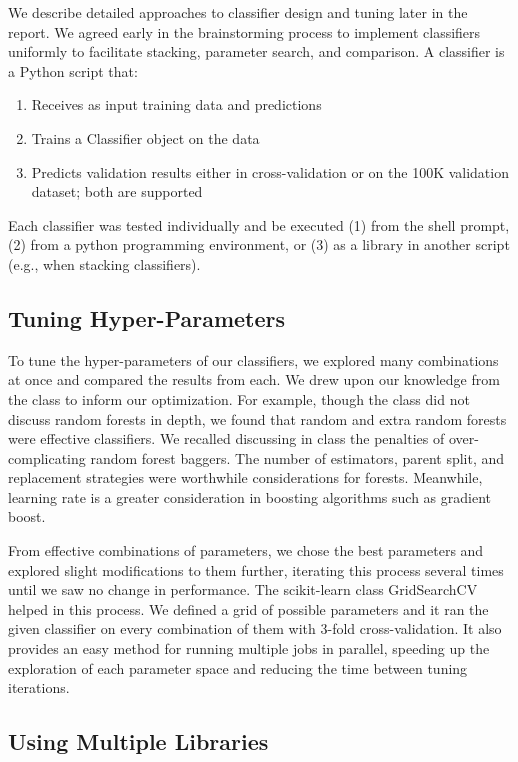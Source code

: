 \documentclass{article}
\begin{document}
We describe detailed approaches to classifier design and tuning later in the report. 
We agreed early in the brainstorming process to implement classifiers uniformly to facilitate stacking, parameter search, and comparison. 
A classifier is a Python script that: 

\begin{enumerate}
\item Receives as input training data and predictions
\item Trains a Classifier object on the data
\item Predicts validation results either in cross-validation or on the 100K validation dataset; both are supported 
\end{enumerate}

Each classifier was tested individually and be executed (1) from the shell prompt, (2) from a python programming environment, or (3) as a library in another script (e.g., when stacking classifiers).

\subsection{Tuning Hyper-Parameters}
\label{tuning_parameters}

To tune the hyper-parameters of our classifiers, we explored many combinations at once and compared the results from each.
We drew upon our knowledge from the class to inform our optimization. 
For example, though the class did not discuss random forests in depth, we found that random and extra random forests were effective classifiers.
We recalled discussing in class the penalties of over-complicating random forest baggers.
The number of estimators, parent split, and replacement strategies were worthwhile considerations for forests.
Meanwhile, learning rate is a greater consideration in boosting algorithms such as gradient boost.

From effective combinations of parameters, we chose the best parameters and explored slight modifications to them further, iterating this process several times until we saw no change in performance.
The scikit-learn class GridSearchCV helped in this process.
We defined a grid of possible parameters and it ran the given classifier on every combination of them with 3-fold cross-validation.
It also provides an easy method for running multiple jobs in parallel, speeding up the exploration of each parameter space and reducing the time between tuning iterations.

\subsection{Using Multiple Libraries}
\label{multiple_libraries}
\end{document}
